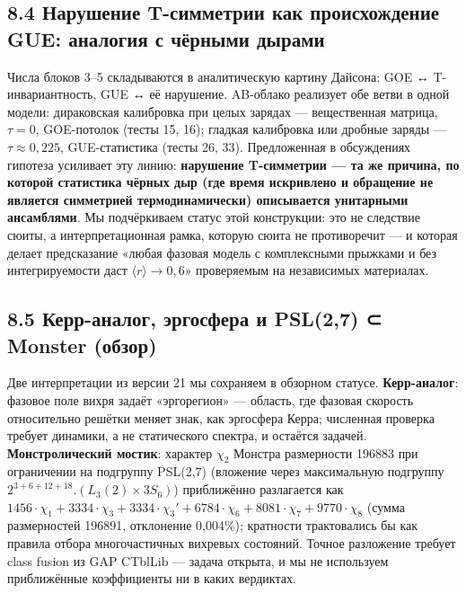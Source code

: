 \documentclass[
]{article}
\begin{document}
\subsection{8.4 Нарушение T-симметрии как происхождение GUE: аналогия с
чёрными
дырами}\label{ux43dux430ux440ux443ux448ux435ux43dux438ux435-t-ux441ux438ux43cux43cux435ux442ux440ux438ux438-ux43aux430ux43a-ux43fux440ux43eux438ux441ux445ux43eux436ux434ux435ux43dux438ux435-gue-ux430ux43dux430ux43bux43eux433ux438ux44f-ux441-ux447ux451ux440ux43dux44bux43cux438-ux434ux44bux440ux430ux43cux438}

Числа блоков 3--5 складываются в аналитическую картину Дайсона: GOE ↔
T-инвариантность, GUE ↔ её нарушение. AB-облако реализует обе ветви в
одной модели: дираковская калибровка при целых зарядах --- вещественная
матрица, \(\tau=0\), GOE-потолок (тесты 15, 16); гладкая калибровка или
дробные заряды --- \(\tau\approx0{,}225\), GUE-статистика (тесты 26,
33). Предложенная в обсуждениях гипотеза усиливает эту линию:
\textbf{нарушение T-симметрии --- та же причина, по которой статистика
чёрных дыр (где время искривлено и обращение не является симметрией
термодинамически) описывается унитарными ансамблями}. Мы подчёркиваем
статус этой конструкции: это не следствие сюиты, а интерпретационная
рамка, которую сюита не противоречит --- и которая делает предсказание
«любая фазовая модель с комплексными прыжками и без интегрируемости даст
\(\langle r\rangle\to0{,}6\)» проверяемым на независимых материалах.

\subsection{8.5 Керр-аналог, эргосфера и PSL(2,7) ⊂ Monster
(обзор)}\label{ux43aux435ux440ux440-ux430ux43dux430ux43bux43eux433-ux44dux440ux433ux43eux441ux444ux435ux440ux430-ux438-psl27-monster-ux43eux431ux437ux43eux440}

Две интерпретации из версии 21 мы сохраняем в обзорном статусе.
\textbf{Керр-аналог}: фазовое поле вихря задаёт «эргорегион» ---
область, где фазовая скорость относительно решётки меняет знак, как
эргосфера Керра; численная проверка требует динамики, а не статического
спектра, и остаётся задачей. \textbf{Монстролический мостик}: характер
\(\chi_2\) Монстра размерности 196883 при ограничении на подгруппу
PSL(2,7) (вложение через максимальную подгруппу
\(2^{3+6+12+18}.(L_3(2)\times3S_6)\)) приближённо разлагается как
\(1456\cdot\chi_1 + 3334\cdot\chi_3 + 3334\cdot\chi_3' + 6784\cdot\chi_6 + 8081\cdot\chi_7 + 9770\cdot\chi_8\)
(сумма размерностей 196891, отклонение 0,004\%); кратности трактовались
бы как правила отбора многочастичных вихревых состояний. Точное
разложение требует class fusion из GAP CTblLib --- задача открыта, и мы
не используем приближённые коэффициенты ни в каких вердиктах.
\end{document}
